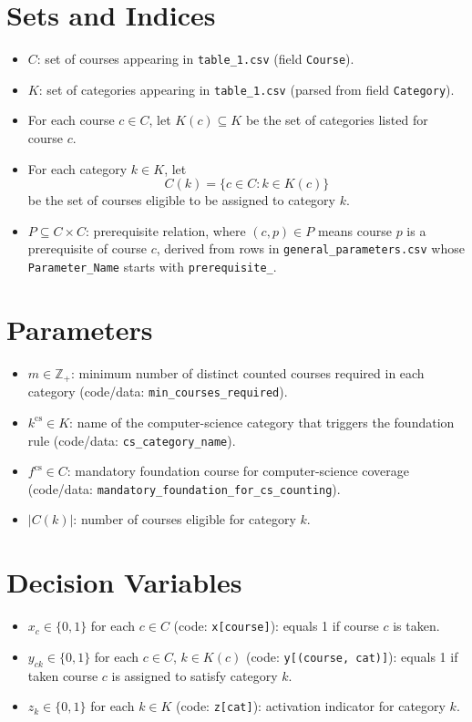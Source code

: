 \section*{Sets and Indices}

\begin{itemize}
    \item $C$: set of courses appearing in \texttt{table\_1.csv} (field \texttt{Course}).
    \item $K$: set of categories appearing in \texttt{table\_1.csv} (parsed from field \texttt{Category}).
    \item For each course $c \in C$, let $K(c) \subseteq K$ be the set of categories listed for course $c$.
    \item For each category $k \in K$, let
    \[
    C(k) = \{c \in C : k \in K(c)\}
    \]
    be the set of courses eligible to be assigned to category $k$.
    \item $P \subseteq C \times C$: prerequisite relation, where $(c,p) \in P$ means course $p$ is a prerequisite of course $c$, derived from rows in \texttt{general\_parameters.csv} whose \texttt{Parameter\_Name} starts with \texttt{prerequisite\_}.
\end{itemize}

\section*{Parameters}

\begin{itemize}
    \item $m \in \mathbb{Z}_{+}$: minimum number of distinct counted courses required in each category (code/data: \texttt{min\_courses\_required}).
    \item $k^{\text{cs}} \in K$: name of the computer-science category that triggers the foundation rule (code/data: \texttt{cs\_category\_name}).
    \item $f^{\text{cs}} \in C$: mandatory foundation course for computer-science coverage (code/data: \texttt{mandatory\_foundation\_for\_cs\_counting}).
    \item $|C(k)|$: number of courses eligible for category $k$.
\end{itemize}

\section*{Decision Variables}

\begin{itemize}
    \item $x_c \in \{0,1\}$ for each $c \in C$ (code: \texttt{x[course]}): equals 1 if course $c$ is taken.
    \item $y_{ck} \in \{0,1\}$ for each $c \in C$, $k \in K(c)$ (code: \texttt{y[(course, cat)]}): equals 1 if taken course $c$ is assigned to satisfy category $k$.
    \item $z_k \in \{0,1\}$ for each $k \in K$ (code: \texttt{z[cat]}): activation indicator for category $k$.
\end{itemize}

